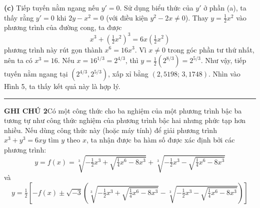 \begin{minipage}[t]{0.70\textwidth}
    \noindent
    \textbf{(c)} Tiếp tuyến nằm ngang nếu $y' = 0$. Sử dụng biểu thức của $y'$ ở phần (a), ta thấy rằng $y' = 0$ khi $2y - x^2 = 0$ (với điều kiện $y^2 - 2x \neq 0$). Thay $y = \frac{1}{2}x^2$ vào phương trình của đường cong, ta được
    \begin{equation*}
        x^3 + \left(\tfrac{1}{2}x^2\right)^3 = 6x\left(\tfrac{1}{2}x^2\right)
    \end{equation*}
    phương trình này rút gọn thành $x^6 = 16x^3$. Vì $x \neq 0$ trong góc phần tư thứ nhất, nên ta có $x^3 = 16$. Nếu $x = 16^{1/3} = 2^{4/3}$, thì $y = \frac{1}{2}(2^{8/3}) = 2^{5/3}$. Như vậy, tiếp tuyến nằm ngang tại $(2^{4/3}, 2^{5/3})$, xấp xỉ bằng $(2{,}5198;\, 3{,}1748)$. Nhìn vào Hình 5, ta thấy kết quả này là hợp lý.\hfill\textcolor{stewartcyan}{\rule{1.1ex}{1.1ex}}

    \vspace{0.25cm}
    \noindent
    \textbf{\textsf{\color{stewartgreen}GHI CHÚ 2}}\quad Có một công thức cho ba nghiệm của một phương trình bậc ba tương tự như công thức nghiệm của phương trình bậc hai nhưng phức tạp hơn nhiều. Nếu dùng công thức này (hoặc máy tính) để giải phương trình $x^3 + y^3 = 6xy$ tìm $y$ theo $x$, ta nhận được ba hàm số được xác định bởi các phương trình:
    \begin{equation*}
        y = f(x) = \sqrt[3]{-\tfrac{1}{2}x^3 + \sqrt{\tfrac{1}{4}x^6 - 8x^3}} + \sqrt[3]{-\tfrac{1}{2}x^3 - \sqrt{\tfrac{1}{4}x^6 - 8x^3}}
    \end{equation*}
    \noindent và
    \begin{equation*}
        y = \tfrac{1}{2}\left[-f(x) \pm \sqrt{-3}\left(\sqrt[3]{-\tfrac{1}{2}x^3 + \sqrt{\tfrac{1}{4}x^6 - 8x^3}} - \sqrt[3]{-\tfrac{1}{2}x^3 - \sqrt{\tfrac{1}{4}x^6 - 8x^3}}\right)\right]
    \end{equation*}
\end{minipage}
